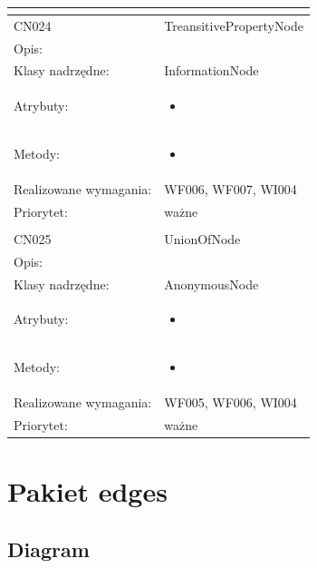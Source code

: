\documentclass[a4paper,10pt]{article}
\begin{document}
\begin{center}
\begin{longtable}{|m{3cm}|m{9cm}|}
\multicolumn{2}{c}{} \\
 \hline

CN024 & TreansitivePropertyNode \\ \hline
Opis: &     \\ \hline
Klasy nadrzędne: & InformationNode     \\ \hline
Atrybuty: & \begin{itemize}
 \item 
\end{itemize}
 \\ \hline
Metody: & \begin{itemize}
 \item 
\end{itemize}
  \\ \hline
Realizowane wymagania: & WF006, WF007, WI004 \\ \hline
Priorytet: & ważne  \\ \hline

\multicolumn{2}{c}{} \\
 \hline

CN025 & UnionOfNode \\ \hline
Opis: &     \\ \hline
Klasy nadrzędne: & AnonymousNode     \\ \hline
Atrybuty: & \begin{itemize}
 \item 
\end{itemize}
 \\ \hline
Metody: & \begin{itemize}
 \item 
\end{itemize}
  \\ \hline
Realizowane wymagania: & WF005, WF006, WI004 \\ \hline
Priorytet: & ważne  \\ \hline



\end{longtable}

\end{center}

\section{Pakiet edges}

\subsection{Diagram}
\end{document}
